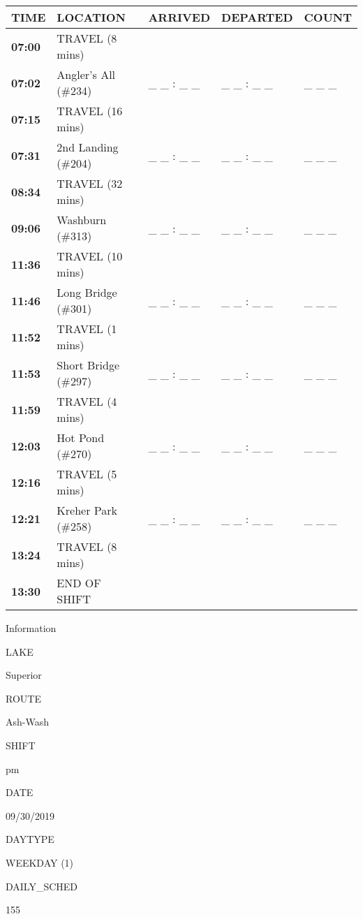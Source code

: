 \documentclass[]{article}
\begin{document}
\begin{tabular}{>{\bfseries}lllll}
\toprule
\textbf{TIME} & \textbf{LOCATION} & \textbf{ARRIVED} & \textbf{DEPARTED} & \textbf{COUNT}\\
\midrule
07:00 & TRAVEL (8 mins) &  &  & \\
07:02 & Angler's All (\#234) & \_ \_ : \_ \_ & \_ \_ : \_ \_ & \_ \_ \_\\
07:15 & TRAVEL (16 mins) &  &  & \\
07:31 & 2nd Landing (\#204) & \_ \_ : \_ \_ & \_ \_ : \_ \_ & \_ \_ \_\\
08:34 & TRAVEL (32 mins) &  &  & \\
09:06 & Washburn (\#313) & \_ \_ : \_ \_ & \_ \_ : \_ \_ & \_ \_ \_\\
11:36 & TRAVEL (10 mins) &  &  & \\
11:46 & Long Bridge (\#301) & \_ \_ : \_ \_ & \_ \_ : \_ \_ & \_ \_ \_\\
11:52 & TRAVEL (1 mins) &  &  & \\
11:53 & Short Bridge (\#297) & \_ \_ : \_ \_ & \_ \_ : \_ \_ & \_ \_ \_\\
11:59 & TRAVEL (4 mins) &  &  & \\
12:03 & Hot Pond (\#270) & \_ \_ : \_ \_ & \_ \_ : \_ \_ & \_ \_ \_\\
12:16 & TRAVEL (5 mins) &  &  & \\
12:21 & Kreher Park (\#258) & \_ \_ : \_ \_ & \_ \_ : \_ \_ & \_ \_ \_\\
13:24 & TRAVEL (8 mins) &  &  & \\
13:30 & END OF SHIFT &  &  & \\
\bottomrule
\end{tabular}\newpage

Information

LAKE

Superior

ROUTE

Ash-Wash

SHIFT

pm

DATE

09/30/2019

DAYTYPE

WEEKDAY (1)

DAILY\_SCHED

155

\vspace{24pt}
\end{document}
